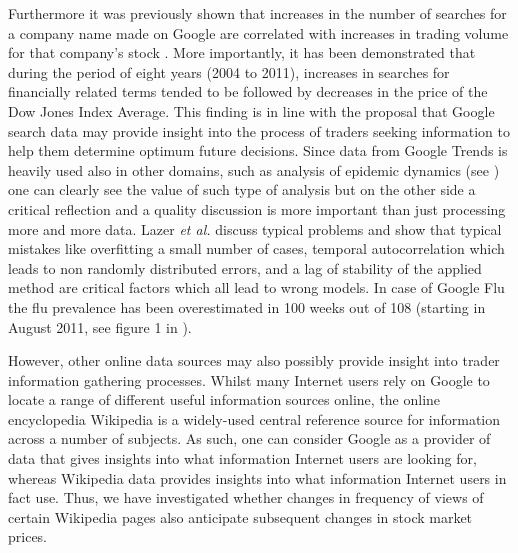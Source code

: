 \documentclass[a4paper,10pt]{scrbook}
\begin{document}
Furthermore it was previously shown that increases in the number of searches for a company name made on Google are correlated with increases in trading volume for that company’s stock \cite{Preis.GoogleStockMarketRelation}. More importantly, it has been demonstrated that during the period of eight years (2004 to 2011), increases in searches for financially related terms tended to be followed by decreases in the price of the Dow Jones Index Average. This finding is in line with the proposal that Google search data may provide insight into the process of traders seeking information to help them determine optimum future decisions. Since data from Google Trends is heavily used also in other domains, such as analysis of epidemic dynamics (see \cite{GoogleFLU}) one can clearly see the value of such type of analysis but on the other side a critical reflection and a quality discussion is more important than just processing more and more data. Lazer \textit{et al.} \cite{Lazer2013} discuss typical problems and show that typical mistakes like overfitting a small number of cases,  temporal autocorrelation which leads to non randomly distributed errors, and a lag of stability of the applied method are critical factors which all lead to wrong models. In case of Google Flu the flu prevalence has been overestimated in 100 weeks out of 108 (starting in August 2011, see figure 1 in \cite{Lazer2013}).

However, other online data sources may also possibly provide insight into trader information gathering processes. Whilst many Internet users rely on Google to locate a range of different useful information sources online, the online encyclopedia Wikipedia is a widely-used central reference source for information across a number of subjects. As such, one can consider Google as a provider of data that gives insights into what information Internet users are looking for, whereas Wikipedia data provides insights into what information Internet users in fact use. Thus, we have investigated whether changes in frequency of views of certain Wikipedia pages also anticipate subsequent changes in stock market prices.  
\end{document}
